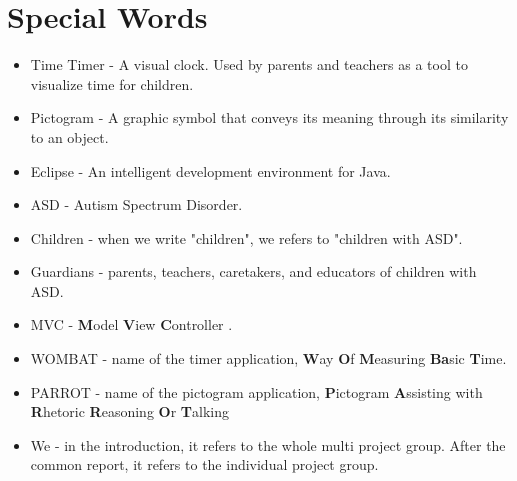 \chapter*{Special Words}

\begin{itemize}

	\item Time Timer - A visual clock. Used by parents and teachers as a tool to visualize time for children.
	\item Pictogram - A graphic symbol that conveys its meaning through its similarity to an object.
	\item Eclipse - An intelligent development environment for Java.
	\item ASD - Autism Spectrum Disorder.
	\item Children - when we write "children", we refers to "children with ASD".
	\item Guardians - parents, teachers, caretakers, and educators of children with ASD.
	\item MVC - \textbf{M}odel \textbf{V}iew \textbf{C}ontroller \cite{MVC}.
	\item WOMBAT - name of the timer application, \textbf{W}ay \textbf{O}f \textbf{M}easuring \textbf{Ba}sic \textbf{T}ime.
	\item PARROT - name of the pictogram application, \textbf{P}ictogram \textbf{A}ssisting with \textbf{R}hetoric \textbf{R}easoning \textbf{O}r \textbf{T}alking
	\item We - in the introduction, it refers to the whole multi project group. After the common report, it refers to the individual project group.

\end{itemize}